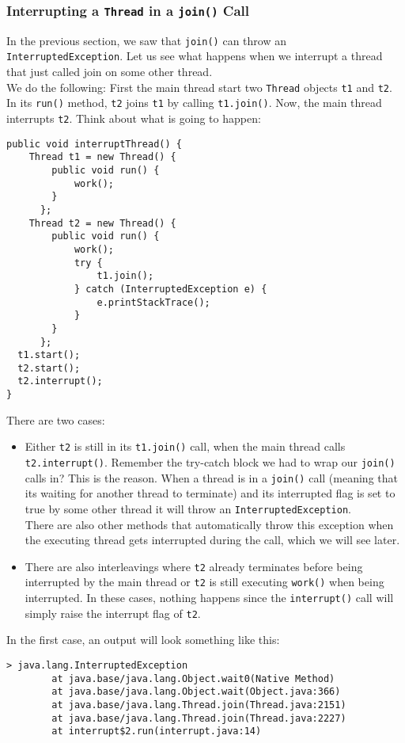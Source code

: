 \documentclass[main.tex]{subfiles}
\begin{document}
\subsubsection{Interrupting a \texttt{Thread} in a \texttt{join()} Call}
In the previous section, we saw that \texttt{join()} can throw an \texttt{InterruptedException}. Let us see what happens when we interrupt a thread that just called join on some other thread.\\[3mm]
We do the following: First the main thread start two \texttt{Thread} objects \texttt{t1} and \texttt{t2}. In its \texttt{run()} method, \texttt{t2} joins \texttt{t1} by calling \texttt{t1.join()}. Now, the main thread interrupts \texttt{t2}. Think about what is going to happen:
\begin{verbatim}
public void interruptThread() {
    Thread t1 = new Thread() {
        public void run() {
            work();
        }
      };
    Thread t2 = new Thread() {
        public void run() {
            work();
            try {
                t1.join();
            } catch (InterruptedException e) {
                e.printStackTrace();
            }
        }
      };
  t1.start();
  t2.start();
  t2.interrupt();
}
\end{verbatim}
There are two cases:
\begin{itemize}
    \item Either \texttt{t2} is still in its \texttt{t1.join()} call, when the main thread calls \texttt{t2.interrupt()}. Remember the try-catch block we had to wrap our \texttt{join()} calls in? This is the reason. When a thread is in a \texttt{join()} call (meaning that its waiting for another thread to terminate) and its interrupted flag is set to true by some other thread it will throw an \texttt{InterruptedException}.\\
          There are also other methods that automatically throw this exception when the executing thread gets interrupted during the call, which we will see later.
    \item There are also interleavings where \texttt{t2} already terminates before being interrupted by the main thread or \texttt{t2} is still executing \texttt{work()} when being interrupted. In these cases, nothing happens since the \texttt{interrupt()} call will simply raise the interrupt flag of \texttt{t2}.
\end{itemize}
In the first case, an output will look something like this:
\begin{verbatim}
> java.lang.InterruptedException
        at java.base/java.lang.Object.wait0(Native Method)
        at java.base/java.lang.Object.wait(Object.java:366)
        at java.base/java.lang.Thread.join(Thread.java:2151)
        at java.base/java.lang.Thread.join(Thread.java:2227)
        at interrupt$2.run(interrupt.java:14)
\end{verbatim}
\end{document}
